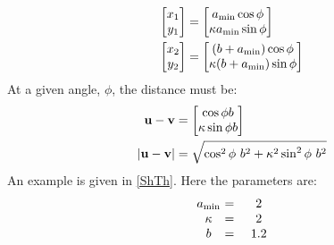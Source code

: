 \begin{align}
	\mqty[x_1 \\y_1] &= \mqty[a_{\min}\cos{\phi}\\\kappa a_{\min}\sin{\phi}] \\
	\mqty[x_2 \\y_2] &= \mqty[\pqty{b+a_{\min}}\cos{\phi}\\\kappa \pqty{b+a_{\min}}\sin{\phi}]
\end{align}
At a given angle, \(\phi\), the distance must be:
\begin{align}
	\vb{u}-\vb{v}       & = \mqty[\cos{\phi}b                                  \\\kappa\sin{\phi}b] \\
	\abs{\vb{u}-\vb{v}} & = \sqrt{\cos^2{\phi}\ b^2+\kappa^2\sin^2{\phi}\ b^2}
\end{align}
An example is given in \cref{ShTh}. Here the parameters are:
\begin{alignat}{3}\label{ellparam}
	\mqty{a_{\min} \\\kappa\\b}&\ \mqty{=\\=\\=}\ &\mqty{2\\2\\1.2}
\end{alignat}
